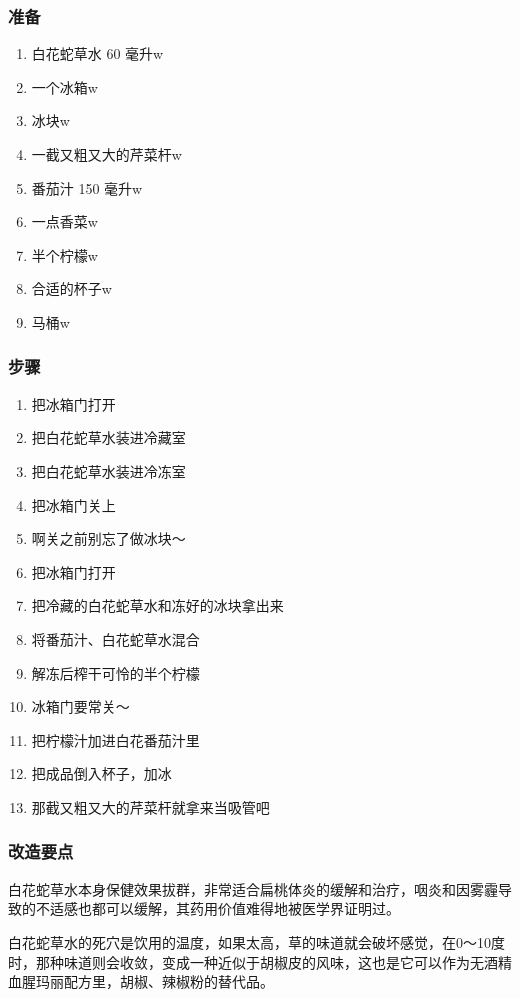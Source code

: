\documentclass[12pt, a4paper]{ctexart}
\begin{document}
\subsubsection{准备}
\begin{enumerate}
    \item{白花蛇草水 60 毫升w}
    \item{一个冰箱w}
    \item{冰块w}
    \item{一截又粗又大的芹菜杆w}
    \item{番茄汁 150 毫升w}
    \item{一点香菜w}
    \item{半个柠檬w}
    \item{合适的杯子w}
    \item{马桶w}
\end{enumerate}

\subsubsection{步骤}
\begin{enumerate}
    \item{把冰箱门打开}
    \item{把白花蛇草水装进冷藏室}
    \item{把白花蛇草水装进冷冻室}
    \item{把冰箱门关上}
    \item{啊关之前别忘了做冰块～}
    \item{把冰箱门打开}
    \item{把冷藏的白花蛇草水和冻好的冰块拿出来}
    \item{将番茄汁、白花蛇草水混合}
    \item{解冻后榨干可怜的半个柠檬}
    \item{冰箱门要常关～}
    \item{把柠檬汁加进白花番茄汁里}
    \item{把成品倒入杯子，加冰}
    \item{那截又粗又大的芹菜杆就拿来当吸管吧}
\end{enumerate}

\subsubsection{改造要点}
白花蛇草水本身保健效果拔群，非常适合扁桃体炎的缓解和治疗，咽炎和因雾霾导致的不适感也都可以缓解，其药用价值难得地被医学界证明过。

白花蛇草水的死穴是饮用的温度，如果太高，草的味道就会破坏感觉，在0～10度时，那种味道则会收敛，变成一种近似于胡椒皮的风味，这也是它可以作为无酒精血腥玛丽配方里，胡椒、辣椒粉的替代品。
\end{document}
